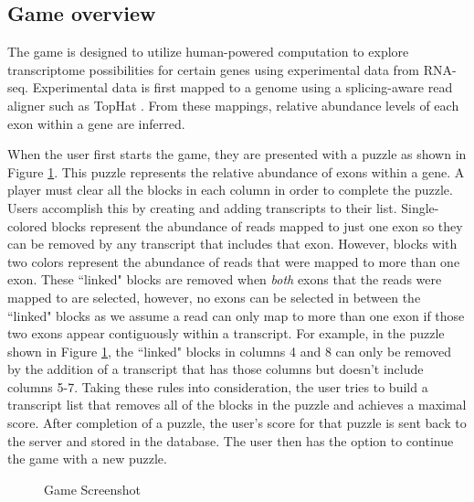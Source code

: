 \documentclass[12pt]{article}
\begin{document}
\subsection*{Game overview}
The game is designed to utilize human-powered computation to explore transcriptome possibilities for certain genes using experimental data from
RNA-seq. Experimental data is first mapped to a genome using a splicing-aware read aligner such as TopHat \citep{trapnell2009tophat}. From these mappings,
relative abundance levels of each exon within a gene are inferred.

When the user first starts the game, they are presented with a puzzle as shown in Figure \ref{fig:gamescreen}. This puzzle represents
the relative abundance of exons within a gene. A player must clear all the blocks in each column in order to complete the puzzle. Users accomplish this by 
creating and adding transcripts to their list. Single-colored blocks represent the abundance of reads mapped to just one exon so they can be removed by any 
transcript that includes that exon. However, blocks with two colors represent the abundance of reads that were mapped to more than one exon. These ``linked"
blocks are removed when \emph{both} exons that the reads were mapped to are selected, however, no exons can be selected in between the ``linked" blocks as
we assume a read can only map to more than one exon if those two exons appear contiguously within a transcript. For example, in the puzzle shown in Figure \ref{fig:gamescreen}, the ``linked" blocks in columns 4 and 8 can only be removed by the addition of a transcript that has those columns but doesn't include columns 5-7. Taking these rules into consideration, the user
tries to build a transcript list that removes all of the blocks in the puzzle and achieves a maximal score. After completion of a puzzle, the user's score for that puzzle is
sent back to the server and stored in the database. The user then has the option to continue the game with a new puzzle.

\begin{figure}[H]
\centering
{} 
\caption{Game Screenshot}\label{fig:gamescreen}
\end{figure}
\end{document}
